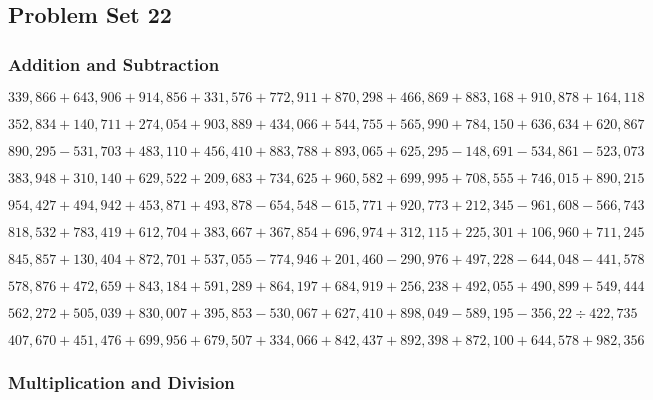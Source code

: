 \hypertarget{problem-set-22-5}{%
\subsection{Problem Set 22}\label{problem-set-22-5}}

\hypertarget{addition-and-subtraction-327}{%
\subsubsection{Addition and
Subtraction}\label{addition-and-subtraction-327}}

\(339,866+643,906+914,856+331,576+772,911+870,298+466,869+883,168+910,878+ 164,118\)

\(352,834+140,711+274,054+903,889+434,066+544,755+565,990+784,150+636,634+620,867\)

\(890,295-531,703+483,110+456,410+883,788+893,065+625,295-148,691-534,861-523,073\)

\(383,948+310,140+629,522+209,683+734,625+960,582+699,995+708,555+746,015+890,215\)

\(954,427+494,942+453,871+493,878-654,548-615,771+920,773+212,345-961,608-566,743\)

\(818,532+783,419+612,704+383,667+367,854+696,974+312,115+225,301+106,960+711,245\)

\(845,857+130,404+872,701+537,055-774,946+201,460-290,976+497,228-644,048-441,578\)

\(578,876+472,659+843,184+591,289+864,197+684,919+256,238+492,055+490,899+549,444\)

\(562,272+505,039+830,007+395,853-530,067+627,410+898,049-589,195-356,22÷422,735\)

\(407,670+451,476+699,956+679,507+334,066+842,437+892,398+872,100+644,578+982,356\)

\hypertarget{multiplication-and-division-326}{%
\subsubsection{Multiplication and
Division}\label{multiplication-and-division-326}}

